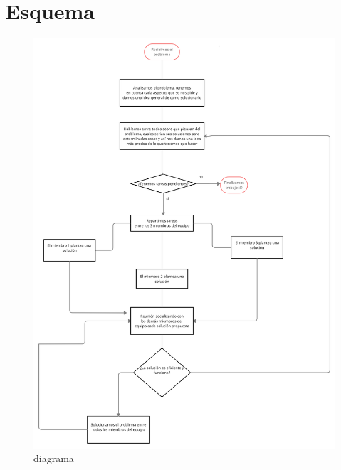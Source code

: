 \documentclass{article}
\begin{document}
\section{Esquema} \label{contenido}
\begin{figure}
    \centering
    \includegraphics[width=16cm]{diagrama.png}
    \caption{diagrama}
    \label{fig:my_label}
\end{figure}


\end{document}
